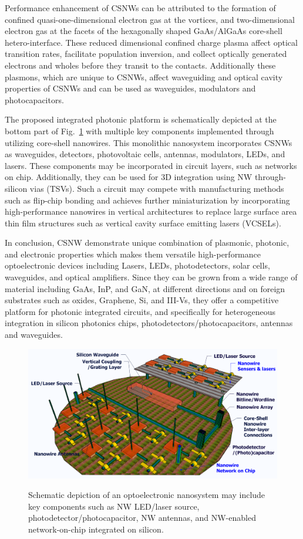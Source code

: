 Performance enhancement of CSNWs can be attributed to the formation of confined
quasi-one-dimensional electron gas at the vortices, and two-dimensional
electron gas at the facets of the hexagonally shaped GaAs/AlGaAs core-shell
hetero-interface.  These reduced dimensional confined charge plasma affect
optical transition rates, facilitate population inversion, and collect
optically generated electrons and wholes before they transit to the contacts.
Additionally these plasmons, which are unique to CSNWs, affect waveguiding and
optical cavity properties of CSNWs and can be used as waveguides, modulators
and photocapacitors.

The proposed integrated photonic platform is schematically depicted at
the bottom part of Fig.~\ref{NWPIC_NB} with multiple key components implemented
through utilizing core-shell nanowires. This monolithic nanosystem
incorporates CSNWs as waveguides, detectors, photovoltaic cells,
antennas, modulators, LEDs, and lasers. These components may be
incorporated in circuit layers, such as networks on chip. Additionally,
they can be used for 3D integration using NW through-silicon vias
(TSVs). Such a circuit may compete with manufacturing methods such as
flip-chip bonding and achieves further miniaturization by incorporating
high-performance nanowires in vertical architectures to replace large
surface area thin film structures such as vertical cavity surface
emitting lasers (VCSELs).

In conclusion, CSNW demonstrate unique combination of plasmonic, photonic,
and electronic properties which makes them versatile high-performance
optoelectronic devices including Lasers, LEDs, photodetectors, solar
cells, waveguides, and optical amplifiers. Since they can be grown from
a wide range of material including GaAs, InP, and GaN, at different
directions and on foreign substrates such as oxides, Graphene, Si, and
III-Vs, they offer a competitive platform for photonic integrated
circuits, and specifically for heterogeneous integration in silicon
photonics chips, photodetectors/photocapacitors, antennas and
waveguides.

\begin{figure}
  \caption{Schematic depiction of an optoelectronic nanosystem may include key components such as NW LED/laser source, photodetector/photocapacitor, NW antennas, and NW-enabled network-on-chip integrated on silicon.}
  \centering
  \includegraphics[width=\textwidth]{pictures/Conclusion/NWPIC_NB}
  \label{NWPIC_NB}
\end{figure}
